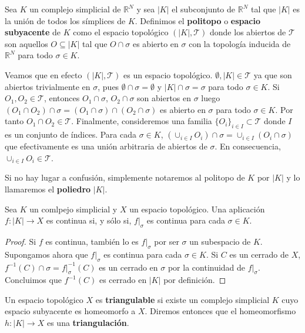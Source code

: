 \begin{definicion}
	Sea $K$ un complejo simplicial de $\mathbb{R}^N$ y sea $|K|$ el subconjunto de $\mathbb{R}^N$ tal que $|K|$ es la unión de todos los símplices de $K$. Definimos el \textbf{politopo} o \textbf{espacio subyacente} 
	de $K$ como el espacio topológico $(|K|, \mathcal{T})$ donde los abiertos de $\mathcal{T}$ son aquellos $O \subseteq |K|$ tal que $O \cap \sigma$ es abierto en $\sigma$ con la topología inducida de $\mathbb{R}^N$ para todo $\sigma \in K$.
\end{definicion}

Veamos que en efecto $(|K|, \mathcal{T})$ es un espacio topológico. $\emptyset, |K| \in \mathcal{T}$ ya que son abiertos trivialmente en $\sigma$, pues $\emptyset \cap \sigma = \emptyset$ y $|K| \cap \sigma = \sigma$ para todo $\sigma \in K$. Si $O_1, O_2 \in \mathcal{T}$, entonces $O_1 \cap \sigma$, $O_2 \cap \sigma$ son abiertos en $\sigma$ luego $(O_1 \cap O_2) \cap \sigma = (O_1 \cap \sigma) \cap (O_2 \cap \sigma)$ es abierto en $\sigma$ para todo $\sigma \in K$. Por tanto $O_1 \cap O_2 \in \mathcal{T}$. Finalmente, consideremos una familia $\{O_i\}_{i \in I} \subset \mathcal{T}$ donde $I$ es un conjunto de índices. Para cada $\sigma \in K$, $(\cup_{i \in I} O_i) \cap \sigma = \cup_{i \in I} (O_i \cap \sigma)$ que efectivamente es una unión arbitraria de abiertos de $\sigma$. En consecuencia, $\cup_{i \in I} O_i \in \mathcal{T}$.

Si no hay lugar a confusión, simplemente notaremos al politopo de $K$ por $|K|$ y lo llamaremos el \textbf{poliedro} $|K|$.

\begin{lema}\label{lem:cont_poly}
	Sea $K$ un comlpejo simplicial y $X$ un espacio topológico. Una aplicación $f: |K| \rightarrow X$ es continua si, y sólo si, $f|_{\sigma}$ es continua para cada $\sigma \in K$.
\end{lema}
\begin{proof}
	Si $f$ es continua, también lo es $f|_{\sigma}$ por ser $\sigma$ un subespacio de $K$. Supongamos ahora que $f|_{\sigma}$ es continua para cada $\sigma \in K$. Si $C$ es un cerrado de $X$, $f^{-1}(C) \cap \sigma = f|_{\sigma}^{-1}(C)$ es un cerrado en $\sigma$ por la continuidad de $f|_{\sigma}$. Concluimos que $f^{-1}(C)$ es cerrado en $|K|$ por definición.
\end{proof}

\begin{definicion}
	Un espacio topológico $X$ es \textbf{triangulable} si existe un complejo simplicial $K$ cuyo espacio subyacente es homeomorfo a $X$. Diremos entonces que el homeomorfismo $h: |K| \rightarrow X$ es una \textbf{triangulación}.
\end{definicion}

